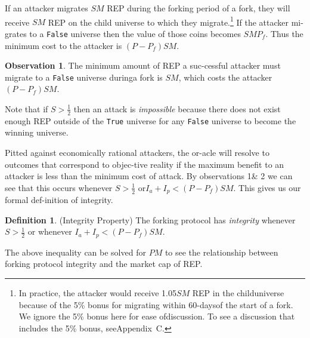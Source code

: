 \documentclass[12pt,floatfix,reprint,nofootinbib,amsmath,amssymb,epsfig,pre,floats,letterpaper,groupedaffiliation]{revtex4-1}
\theoremstyle{definition}
\newtheorem{observation}{Observation}
\theoremstyle{definition}
\newtheorem{definition}{Definition}
\begin{document}
If an attacker migrates $SM$ REP during the forking period of a fork, they will receive $SM$ REP on the child universe to which they migrate.\footnote{In practice, the attacker would receive 1.05$SM$ REP in the child\linebreak universe because of the 5\% bonus for migrating within 60-days\linebreak of the start of a fork. We ignore the 5\% bonus here for ease of\linebreak discussion. To see a discussion that includes the 5\% bonus, see\linebreak Appendix~C.} If the attacker mi-\linebreak grates to a \texttt{False} universe then the value of those coins becomes $SMP_f$. Thus the minimum cost to the attacker is $(P - P_f)SM$.

\begin{observation}
The minimum amount of REP a suc-\linebreak cessful attacker must migrate to a \texttt{False} universe during\linebreak a fork is $SM$, which costs the attacker $(P - P_f)SM$.
\end{observation}

Note that if $S > \frac{1}{2}$ then an attack is \textit{impossible} because there does not exist enough REP outside of the \texttt{True} universe for any \texttt{False} universe to become the winning universe.

Pitted against economically rational attackers, the or-\linebreak acle will resolve to outcomes that correspond to objec-\linebreak tive reality if the maximum benefit to an attacker is less than the minimum cost of attack. By observations 1\linebreak \& 2 we can see that this occurs whenever $S > \frac{1}{2}$ or\linebreak $I_a + I_p < (P - P_f)SM$. This gives us our formal def-\linebreak inition of integrity.

\begin{definition}\label{ob:integrity_property}
(Integrity Property) The forking protocol has \textit{integrity} whenever $S > \frac{1}{2}$ or whenever $I_a + I_p < (P - P_f)SM$.
\end{definition}

The above inequality can be solved for $PM$ to see the relationship between forking protocol integrity and the market cap of REP.
\end{document}
